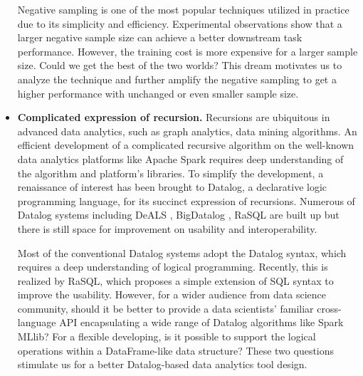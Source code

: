 \documentclass [PhD] {uclathes}
\begin{document}
\begin{itemize}
	Negative sampling is one of the most popular techniques utilized in practice due to its simplicity and efficiency. Experimental observations show that a larger negative sample size can achieve a better downstream task performance. However, the training cost is more expensive for a larger sample size. Could we get the best of the two worlds? This dream motivates us to analyze the technique and further amplify the negative sampling to get a higher performance with unchanged or even smaller sample size. 
	
	

	
	\item \textbf{Complicated expression of recursion.} Recursions are ubiquitous in advanced data analytics, such as graph analytics,  
	data mining algorithms. An efficient development of a complicated recursive algorithm on the well-known data analytics platforms like Apache Spark requires deep understanding of the algorithm and platform's libraries. To simplify the development,  a renaissance of interest has been brought to Datalog, a declarative logic programming language, for its succinct expression of recursions. Numerous of Datalog systems including DeALS \citep{yang2015parallel}, BigDatalog \citep{shkapsky2016big}, RaSQL \citep{gu2019rasql} are built up but there is still space for improvement on usability and interoperability.
	
	Most of the conventional Datalog systems adopt the Datalog syntax, which requires a deep understanding of logical programming. Recently, this is realized by RaSQL, which proposes a simple extension of  SQL syntax to improve the usability.  However, for a wider audience from data science community, should it be better to  provide a  data scientists' familiar cross-language API encapsulating a wide range of Datalog algorithms like Spark MLlib? For a flexible developing, is it possible to support the logical operations within a DataFrame-like  data structure? These two questions stimulate us for a better Datalog-based data analytics tool design.

\end{itemize}
\end{document}
